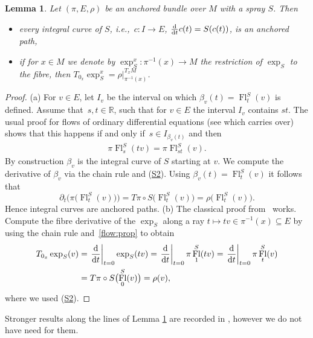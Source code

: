 \documentclass[pdftex]{sigma}
\numberwithin{equation}{section}
\newtheorem{Lemma}[Theorem]{Lemma}
\newcommand{\R}{\ensuremath{\mathbb{R}}}
\DeclareMathOperator{\Fl}{Fl}
\begin{document}
\begin{Lemma}\label{lem:spec_curv}
Let $(\pi, E,\rho)$ be an anchored bundle over $M$ with a spray $S$. Then
\begin{itemize}\itemsep=0pt
\item[$(a)$] every integral curve of $S$, i.e.,~$c \colon I \rightarrow E$, $\frac{{\rm d}}{{\rm d}t}c(t)=S(c(t))$, is an anchored path,
\item[$(b)$] if for $x \in M$ we denote by $\exp_S^x \colon \pi^{-1}(x)\rightarrow M$ the restriction of $\exp_S$ to the fibre, then $T_{0_x} \exp_S^x = \rho|_{\pi^{-1}(x)}^{T_xM}$.
\end{itemize}
\end{Lemma}

\begin{proof}
(a) For $v \in E$, let $I_v$ be the interval on which $\beta_v (t)= \Fl_{t}^S(v)$ is defined. Assume that~${s,t \in \R}$, such that for $v \in E$ the interval $I_v$ contains $st$.
The usual proof for flows of ordinary differential equations (see \cite[p.~106]{La01} which carries over) shows that this happens if and only if~${s \in I_{\beta_v(t)}}$ and then
\begin{align}
\pi\Fl_{s}^S(tv)= \pi \Fl^S_{st}(v).\label{flow:prop}
\end{align}
By construction $\beta_v$ is the integral curve of $S$ starting at $v$.
We compute the derivative of $\beta_v$ via the chain rule and (\hyperlink{sprayS2}{S2}).
Using {$\beta_v (t)=\Fl^S_t (v)$} it follows that
\begin{displaymath}
 \partial_t \bigl(\pi\bigl(\Fl^S_t (v)\bigr)\bigr) = T\pi \circ S \bigl(\Fl^S_t (v)\bigr) = \rho \bigl(\Fl^S_t (v)\bigr).\end{displaymath}
Hence integral curves are anchored paths.
(b) The classical proof from~\cite{La01} works. Compute the fibre derivative of the $\exp_S$ along a ray $t\mapsto tv \in \pi^{-1}(x) \subseteq E$ by using the chain rule and~\eqref{flow:prop} to obtain
\begin{align*}
T_{0_x}\exp_S (v)&=\left.\frac{{\rm d}}{{\rm d}t}\right|_{t=0} \exp_S (tv)= \left. \frac{{\rm d}}{{\rm d}t}\right|_{t=0} \pi \Fl^{S}_{1}(tv) = \left. \frac{{\rm d}}{{\rm d}t}\right|_{t=0} \pi \Fl^{S}_{t}(v) \\
&=T\pi \circ S\bigl(\Fl_0^S(v)\bigr) =\rho (v),
\end{align*}
where we used (\hyperlink{sprayS2}{S2}).
\end{proof}

Stronger results along the lines of Lemma \ref{lem:spec_curv} are recorded in \cite{ana11}, however we do not have need for them.
\end{document}
